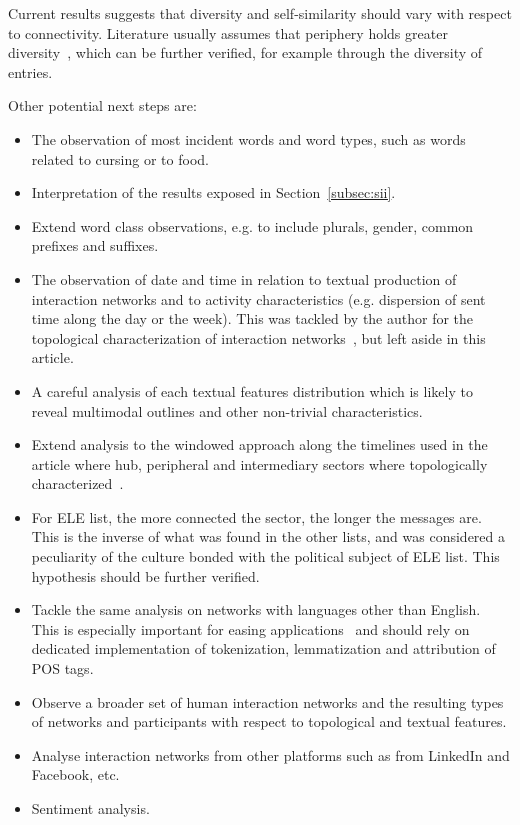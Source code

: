 \documentclass[%
 aip,
 jmp,%
 amsmath,amssymb,
 reprint,%
]{revtex4-1}
\begin{document}
Current results suggests that diversity and self-similarity should vary with respect to connectivity. 
Literature usually assumes that periphery holds greater diversity~\cite{easley},
which can be further verified, for example through the diversity of entries.

Other potential next steps are:
\begin{itemize}
    \item The observation of most incident words and word types,
	    such as words related to cursing or to food.
    \item Interpretation of the results
	    exposed in Section~\ref{subsec:sii}.
    \item Extend word class observations, e.g. to include plurals, gender, common prefixes and suffixes.
    \item The observation of date and time in relation to textual production of interaction networks and
	    to activity characteristics (e.g. dispersion of sent time along the day or the week).
	    This was tackled by the author for the topological characterization of interaction networks~\cite{evoSN}, but left aside in this article.
    \item A careful analysis of each textual features distribution which is likely to reveal multimodal outlines and other non-trivial characteristics.
    \item Extend analysis to the windowed approach along the timelines used in the article where hub, peripheral and intermediary sectors where topologically characterized~\cite{evoSN}.
    \item For ELE list, the more connected the sector, the longer the messages are.
	    This is the inverse of what was found in the other lists,
	    and was considered a peculiarity of the culture bonded with the political subject of ELE list.
	    This hypothesis should be further verified.
    \item Tackle the same analysis on networks with languages other than English.
	    This is especially important for easing applications~\cite{ensaio}
	    and should rely on dedicated implementation of 
	    tokenization, lemmatization and attribution of POS tags.
    \item Observe a broader set of human interaction networks and the resulting types
	    of networks and participants with respect to topological and textual features.
    \item Analyse interaction networks from other platforms such as from LinkedIn and Facebook, etc.
    \item Sentiment analysis.
\end{itemize}
\end{document}
